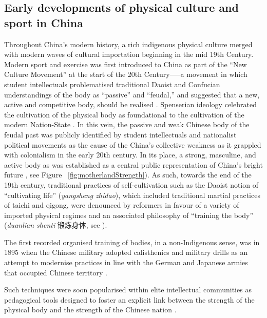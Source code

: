 \subsection{Early developments of physical culture and sport in China}
Throughout China's modern history, a rich indigenous physical culture merged with modern waves of cultural importation beginning in the mid 19th Century. Modern sport and exercise was first introduced to China as part of the ``New Culture Movement'' at the start of the 20th Century—--a movement in which student intellectuals problematised traditional Daoist and Confucian understandings of the body as ``passive'' and ``feudal,'' and suggested that a new, active and competitive body, should be realised \citep{Ge2005}.  Spenserian ideology celebrated the cultivation of the physical body as foundational to the cultivation of the modern Nation-State \citep{Morris2004}. In this vein, the passive and weak Chinese body of the feudal past was publicly identified by student intellectuals and nationalist political movements as the cause of the China's collective weakness as it grappled with colonialism in the early 20th century.
In its place, a strong, masculine, and active body as was established as a central public representation of China's bright future \citep{Brownell1995}, see Figure ~\ref{fig:motherlandStrength}).  As such, towards the end of the 19th century, traditional practices of self-cultivation such as the Daoist notion of ``cultivating life'' (\textit{yangsheng zhidao}), which included traditional martial practices of taichi and qigong, were denounced by reformers in favour of a variety of imported physical regimes and an associated philosophy of ``training the body'' (\textit{duanlian shenti} 锻炼身体, see \cite{Farquhar2012}).

The first recorded organised training of bodies, in a non-Indigenous sense, was in 1895 when the Chinese military adopted calisthenics and military drills as an attempt to modernise practices in line with the German and Japanese armies that occupied Chinese territory \citep[viii]{Knuttgen1990}.


Such techniques were soon popularised within elite intellectual communities as pedagogical tools designed to foster an explicit link between the strength of the physical body and the strength of the Chinese nation \cites[32]{Morris2004}[49]{Brownell1995}.

